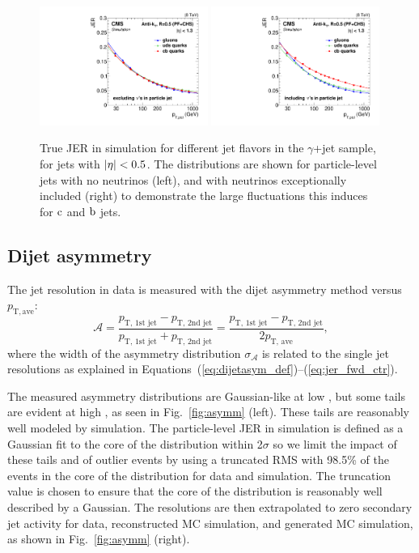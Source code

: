 \documentclass[11pt,twoside,a4paper,cmspaper,final,collab]{cms-tdr}
\begin{document}
\begin{figure}[htbp!]
\centering
\includegraphics[width=0.49\textwidth]{Figure_038-a.pdf}
\includegraphics[width=0.49\textwidth]{Figure_038-b.pdf}
\caption{\label{fig:jerflavor}
True JER in simulation for different jet flavors in the $\gamma$+jet sample, for jets with $\lvert \eta \rvert<0.5$. The distributions are shown for particle-level jets with no neutrinos (left), and with neutrinos exceptionally included (right) to demonstrate the large fluctuations this induces for $\mathrm{c}$ and $\mathrm{b}$ jets.
}
\end{figure}

\subsection{Dijet asymmetry}

The jet \pt resolution in data is measured with the dijet asymmetry method \cite{JEC_JINST} versus $p_\mathrm{T, ave}$:
\begin{equation}
\mathcal{A}= \frac{p_\text{T, 1st jet}-p_\text{T, 2nd jet}}{p_\text{T, 1st jet}+p_\text{T, 2nd jet}} = \frac{p_\text{T, 1st jet}-p_\text{T, 2nd jet}}{2p_\text{T, ave}},
\label{eq:asymm}
\end{equation}
where the width of the asymmetry distribution $\sigma_\mathcal{A}$ is related to the single jet resolutions as explained in Equations~(\ref{eq:dijetasym_def})--(\ref{eq:jer_fwd_ctr}).

The measured asymmetry distributions are Gaussian-like at low \pt, but some tails are evident at high \pt, as seen in Fig.~\ref{fig:asymm} (left). These tails are reasonably well modeled by simulation. The particle-level JER in simulation is defined as a Gaussian fit to the core of the distribution within 2$\sigma$ so we limit the impact of these tails and of outlier events by using a truncated RMS with 98.5\% of the events in the core of the distribution for data and simulation. The truncation value is chosen to ensure that the core of the distribution is reasonably well described by a Gaussian.
The resolutions are then extrapolated to zero secondary jet activity for data, reconstructed MC simulation, and generated MC simulation, as shown in Fig.~\ref{fig:asymm} (right).
\end{document}
